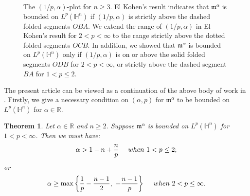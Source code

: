 \documentclass[11pt]{amsproc}
\newcommand{\R}{\mathbb{R}}
\newcommand{\fm}{\mathfrak{m}}
\newcommand{\0}{\mathbf{0}}
\renewcommand{\H}{\mathbb{H}}
\numberwithin{equation}{section}
\numberwithin{figure}{section}
\newtheorem{thm}{Theorem}
\theoremstyle{definition}
\theoremstyle{remark}
\numberwithin{thm}{section}
\begin{document}
\begin{figure}[H]
\caption{The $(1/p,\alpha)$-plot for $n\geq 3$. El Kohen's result \cite[Theorem 3]{Ko} indicates that $\fm^\alpha$ is bounded on $L^p(\H^n)$ if $(1/p,\alpha)$ is strictly above the dashed folded  segments $OBA$. We extend the range of $(1/p,\alpha)$ in El Kohen's result for $2<p<\infty$ to the range strictly above the dotted folded segments $OCB$. In addition, we showed that $\fm^\alpha$ is bounded on $L^p(\H^n)$ only if $(1/p,\alpha)$ is on or above the solid folded segments $ODB$ for $2<p<\infty$, or strictly above the dashed segment $BA$ for $1<p\leq 2$.}
\label{fig:1}
\end{figure}





The present article  can be viewed as a continuation of the above body of work in   \cite{Io, Ko}.
Firstly,  we give a necessary condition on $(\alpha,p)$ for $\fm^\alpha$ to be bounded on $L^p(\H^n)$
for $\alpha\in\R$.

\begin{thm}\label{thm:1.1}
Let $\alpha\in\R$ and $n\geq 2$. Suppose  $\fm^\alpha$ is bounded on $L^p(\H^n)$ for $1<p<\infty$. Then we must have:
\begin{eqnarray}\label{e1.13}
\alpha>1-n+ {n\over p} \ \ \ \     {\rm when}\     1<p\leq 2;
\end{eqnarray}
or
\begin{eqnarray}\label{e1.14}
\alpha\geq  \max\left\{{1\over p}-{n-1\over 2},\ -{n-1\over p}\right\}\ \ \ \     {\rm when}\     2<p\leq \infty.
\end{eqnarray}
\end{thm}
\end{document}
